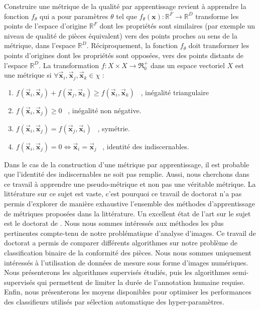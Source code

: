 Construire une métrique de la qualité par apprentissage revient à apprendre la fonction $f_{\theta}$ qui a pour paramètres $\theta$ tel que $f_{\theta}(\mathbf{x}) : \mathbb{R}^{F} \rightarrow \mathbb{R}^{D}$ transforme les points de l'espace d'origine $\mathbb{R}^{F}$ dont les propriétés sont similaires (par exemple un niveau de qualité de pièces équivalent) vers des points proches au sens de la métrique, dans l'espace $\mathbb{R}^{D}$.
Réciproquement, la fonction $f_{\theta}$ doit transformer les points d'origines dont les propriétés sont opposées, vers des points distants de l'espace $\mathbb{R}^{D}$.
La transformation $f : X \times X \rightarrow \Re_{0}^{+} $ dans un espace vectoriel $X$ est une métrique si $\forall \vec{\mathbf{x}}_{i}, \vec{\mathbf{x}}_{j}, \vec{\mathbf{x}}_{k} \in \chi$ :

\begin{enumerate}
\item $f\left(\vec{\mathbf{x}}_{i}, \vec{\mathbf{x}}_{j}\right) + f\left(\vec{\mathbf{x}}_{j}, \vec{\mathbf{x}}_{k}\right) \geq f\left(\vec{\mathbf{x}}_{i}, \vec{\mathbf{x}}_{k}\right)$ \ , inégalité triangulaire
\item $f\left(\vec{\mathbf{x}}_{i}, \vec{\mathbf{x}}_{j}\right) \geq 0$ \ , inégalité non négative.
\item $f\left(\vec{\mathbf{x}}_{i}, \vec{\mathbf{x}}_{j}\right)=f\left(\vec{\mathbf{x}}_{j}, \vec{\mathbf{x}}_{i}\right)$ \ , symétrie.
\item $f\left(\vec{\mathbf{x}}_{i}, \vec{\mathbf{x}}_{j}\right)=0 \Longleftrightarrow \vec{\mathbf{x}}_{i}=\vec{\mathbf{x}}_{j}$ \ , identité des indiscernables.
\end{enumerate}

Dans le cas de la construction d'une métrique par apprentissage, il est probable que l'identité des indiscernables ne soit pas remplie.
Aussi, nous cherchons dans ce travail à apprendre une pseudo-métrique et non pas une véritable métrique.
La littérature sur ce sujet est vaste, c'est pourquoi ce travail de doctorat n'a pas permis d'explorer de manière exhaustive l'ensemble des méthodes d'apprentissage de métriques proposées dans la littérature.
Un excellent état de l'art sur le sujet est le doctorat de \citeauthor{bellet_supervised_2012} \cite{bellet_supervised_2012}.
Nous nous sommes intéressés aux méthodes les plus pertinentes compte-tenu de notre problématique d'analyse d'images.
Ce travail de doctorat a permis de comparer différents algorithmes sur notre problème de classification binaire de la conformité des pièces.
Nous nous sommes uniquement intéressés à l'utilisation de données de mesure sous forme d'images numériques.
Nous présenterons les algorithmes supervisés étudiés, puis les algorithmes semi-supervisés qui permettent de limiter la durée de l'annotation humaine requise.
Enfin, nous présenterons les moyens disponibles pour optimiser les performances des classifieurs utilisés par sélection automatique des hyper-paramètres.

